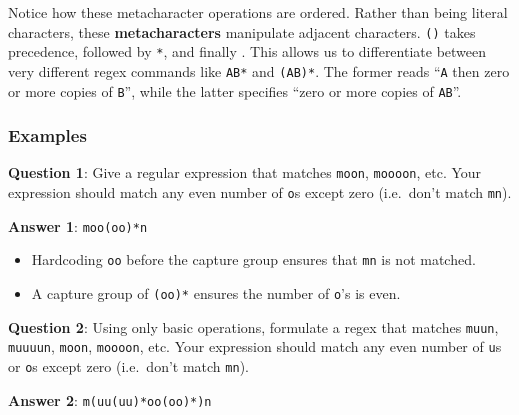 \documentclass[
  letterpaper,
  DIV=11,
  numbers=noendperiod]{scrreprt}
\providecommand{\tightlist}{%
  \setlength{\itemsep}{0pt}\setlength{\parskip}{0pt}}\usepackage{longtable,booktabs,array}
\begin{document}
Notice how these metacharacter operations are ordered. Rather than being
literal characters, these \textbf{metacharacters} manipulate adjacent
characters. \texttt{()} takes precedence, followed by \texttt{*}, and
finally \texttt{\textbar{}}. This allows us to differentiate between
very different regex commands like \texttt{AB*} and \texttt{(AB)*}. The
former reads ``\texttt{A} then zero or more copies of \texttt{B}'',
while the latter specifies ``zero or more copies of \texttt{AB}''.

\hypertarget{examples}{%
\subsubsection{Examples}\label{examples}}

\textbf{Question 1}: Give a regular expression that matches
\texttt{moon}, \texttt{moooon}, etc. Your expression should match any
even number of \texttt{o}s except zero (i.e.~don't match \texttt{mn}).

\textbf{Answer 1}: \texttt{moo(oo)*n}

\begin{itemize}
\tightlist
\item
  Hardcoding \texttt{oo} before the capture group ensures that
  \texttt{mn} is not matched.
\item
  A capture group of \texttt{(oo)*} ensures the number of \texttt{o}'s
  is even.
\end{itemize}

\textbf{Question 2}: Using only basic operations, formulate a regex that
matches \texttt{muun}, \texttt{muuuun}, \texttt{moon}, \texttt{moooon},
etc. Your expression should match any even number of \texttt{u}s or
\texttt{o}s except zero (i.e.~don't match \texttt{mn}).

\textbf{Answer 2}: \texttt{m(uu(uu)*\textbar{}oo(oo)*)n}
\end{document}

